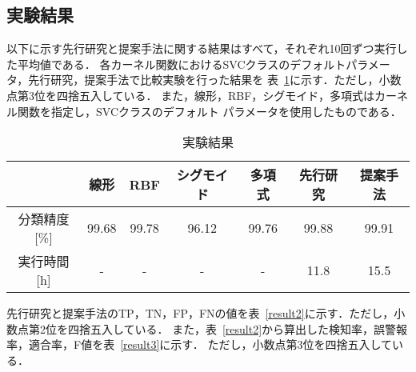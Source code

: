 \subsection{実験結果}
以下に示す先行研究と提案手法に関する結果はすべて，それぞれ10回ずつ実行した平均値である．
各カーネル関数におけるSVCクラスのデフォルトパラメータ，先行研究，提案手法で比較実験を行った結果を
表~\ref{result1}に示す．ただし，小数点第3位を四捨五入している．
また，線形，RBF，シグモイド，多項式はカーネル関数を指定し，SVCクラスのデフォルト
パラメータを使用したものである．
\begin{table}[b]
    \centering
    \caption{実験結果}  %
    \begin{tabular}{|c|c|c|c|c|c|c|}  %
        \hline  %
        ~ & 線形 &RBF &シグモイド&多項式&先行研究 & 提案手法\\  %
        \hline  %
        分類精度[\%]& 99.68&99.78&96.12&99.76&99.88& 99.91\\  %
        \hline  %
        実行時間[h] & - & -&-&-&11.8& 15.5\\  %
        \hline  %
    \end{tabular}
    \label{result1}  %
  \end{table}
  先行研究と提案手法のTP，TN，FP，FNの値を表~\ref{result2}に示す．ただし，小数点第2位を四捨五入している．
また，表~\ref{result2}から算出した検知率，誤警報率，適合率，F値を表~\ref{result3}に示す．
ただし，小数点第3位を四捨五入している．
